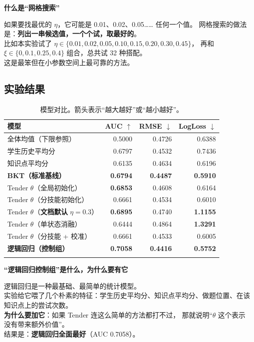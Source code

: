 \documentclass[UTF8,a4paper,11pt]{ctexart}
\newenvironment{explainbox}[1]
{\begin{center}\begin{minipage}{0.94\textwidth}\colorbox{boxbg}{\parbox{0.92\textwidth}{\textbf{#1}\par\vspace{2pt}}}}
{\end{minipage}\end{center}}
\newcommand{\warn}[1]{\textcolor{red!70!black}{\textbf{#1}}}
\begin{document}
\begin{explainbox}{什么是“网格搜索”}
如果要找最优的 $\eta$，它可能是 0.01、0.02、0.05…… 任何一个值。
网格搜索的做法是：\textbf{列出一串候选值，一个个试，取最好的}。\\
比如本实验试了 $\eta \in \{0.01, 0.02, 0.05, 0.10, 0.15, 0.20, 0.30, 0.45\}$，
再和 $\xi \in \{0, 0.1, 0.25, 0.4\}$ 组合，总共试 32 种搭配。\\
这是最笨但在小参数空间上最可靠的方法。
\end{explainbox}

\subsection{实验结果}

\begin{longtable}{@{}p{6.0cm}rrr@{}}
\toprule
\textbf{模型} & \textbf{AUC $\uparrow$} & \textbf{RMSE $\downarrow$} & \textbf{LogLoss $\downarrow$} \\
\midrule
全体均值（下限参照） & 0.5000 & 0.4726 & 0.6388 \\
学生历史平均分 & 0.6797 & 0.4532 & 0.7436 \\
知识点平均分 & 0.6135 & 0.4634 & 0.6196 \\
\textbf{BKT（标准基线）} & \textbf{0.6794} & \textbf{0.4487} & \textbf{0.5910} \\
\midrule
Tender $\theta$（全局初始化） & \textbf{0.6853} & 0.4608 & 0.6164 \\
Tender $\theta$（分技能初始化） & 0.6661 & 0.4534 & 0.6010 \\
Tender $\theta$（\textbf{文档默认} $\eta=0.3$） & \textbf{0.6895} & 0.4740 & \warn{1.1155} \\
Tender $\theta$（单状态消融） & 0.6444 & 0.4864 & \warn{1.3291} \\
Tender $\theta$（分技能 + 校准） & 0.6661 & 0.4533 & 0.6005 \\
\midrule
\textbf{逻辑回归（控制组）} & \textbf{0.7058} & \textbf{0.4416} & \textbf{0.5752} \\
\bottomrule
\caption{模型对比。箭头表示“越大越好”或“越小越好”。}
\end{longtable}

\begin{explainbox}{“逻辑回归控制组”是什么，为什么要有它}
逻辑回归是一种最基础、最简单的统计模型。\\
实验给它喂了几个朴素的特征：学生历史平均分、知识点平均分、做题位置、在该知识点上的尝试次数。\\
\textbf{为什么要加它}：如果 Tender 连这么简单的方法都打不过，
那就说明“$\theta$ 这个表示没有带来额外价值”。\\
结果是：\warn{逻辑回归全面最好}（AUC 0.7058）。
\end{explainbox}
\end{document}
